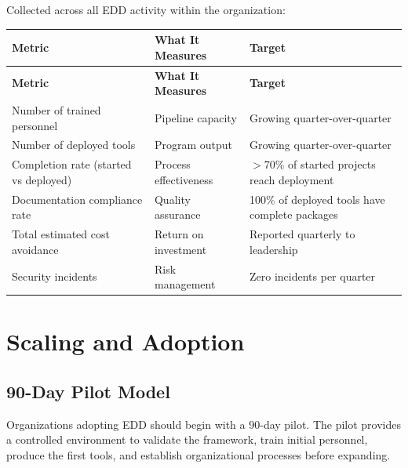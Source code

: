 \documentclass[11pt,letterpaper]{article}
\begin{document}
Collected across all EDD activity within the organization:

\begin{longtable}{@{}p{3.5cm}p{3.5cm}p{6.5cm}@{}}
\toprule
\textbf{Metric} & \textbf{What It Measures} & \textbf{Target} \\
\midrule
\endfirsthead
\toprule
\textbf{Metric} & \textbf{What It Measures} & \textbf{Target} \\
\midrule
\endhead
\bottomrule
\endlastfoot
Number of trained personnel & Pipeline capacity & Growing quarter-over-quarter \\
\midrule
Number of deployed tools & Program output & Growing quarter-over-quarter \\
\midrule
Completion rate (started vs deployed) & Process effectiveness & $>$70\% of started projects reach deployment \\
\midrule
Documentation compliance rate & Quality assurance & 100\% of deployed tools have complete packages \\
\midrule
Total estimated cost avoidance & Return on investment & Reported quarterly to leadership \\
\midrule
Security incidents & Risk management & Zero incidents per quarter \\
\end{longtable}

\section{Scaling and Adoption}
\label{sec:scaling-and-adoption}

\subsection{90-Day Pilot Model}
\label{sec:pilot-model}

Organizations adopting EDD should begin with a 90-day pilot. The pilot provides a
controlled environment to validate the framework, train initial personnel, produce
the first tools, and establish organizational processes before expanding.
\end{document}
